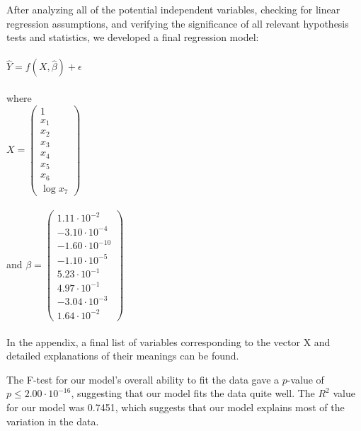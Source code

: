 \documentclass[oneside,12pt]{report}
\begin{document}
After analyzing all of the potential independent variables, checking for linear regression assumptions, and verifying the significance of all relevant hypothesis tests and statistics, we developed a final regression model:
\\
\\
\begin{math}
\widehat{Y} = f(X,\hat\beta) + \epsilon
\end{math}
\\
\\
where
\\
\begin{math} X = 
\begin{pmatrix}
1 \\ x_1 \\ x_2 \\ x_3 \\ x_4 \\ x_5 \\ x_6 \\ \log{x_7}
\end{pmatrix}
\end{math}
\\
\\
and
\begin{math} \beta =
\begin{pmatrix}
1.11\cdot10^{-2} \\ -3.10\cdot10^{-4} \\ -1.60\cdot10^{-10} \\ -1.10\cdot10^{-5} \\
5.23\cdot10^{-1} \\ 4.97\cdot10^{-1} \\ -3.04\cdot10^{-3} \\ 1.64\cdot10^{-2}
\end{pmatrix}
\end{math}
\\ \\
In the appendix, a final list of variables corresponding to the vector X and detailed explanations of their meanings can be found.

The F-test for our model's overall ability to fit the data gave a $p$-value of \begin{math}p\leq2.00\cdot10^{-16}\end{math}, suggesting that our model fits the data quite well.
The \begin{math}R^2\end{math} value for our model was 0.7451, which suggests that our model explains most of the variation in the data.
\end{document}
